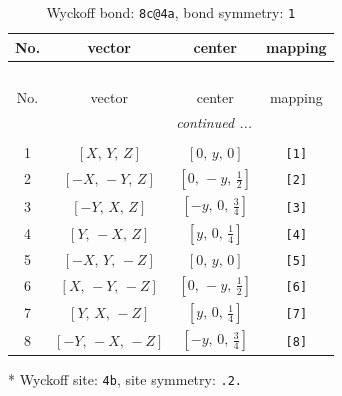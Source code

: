 \documentclass[fleqn,8pt]{jsarticle}
\begin{document}
\begin{longtable}{cccc}
\caption{Wyckoff bond: {\tt 8c@4a}, bond symmetry: {\tt 1}}
 \\
 \hline \hline
No. & vector & center & mapping \\ \hline \endfirsthead

\multicolumn{3}{l}{\tablename\ \thetable{}} \\
 \hline \hline
No. & vector & center & mapping \\ \hline \endhead

 \hline \hline
\multicolumn{3}{r}{\footnotesize\it continued ...} \\ \endfoot

 \hline \hline
\multicolumn{3}{r}{} \\ \endlastfoot

1 & $\left[ X,\, Y,\, Z \right]$ & $\left[ 0,\, y,\, 0 \right]$ & {\tt [1]} \\ \hline
2 & $\left[ - X,\, - Y,\, Z \right]$ & $\left[ 0,\, - y,\, \frac{1}{2} \right]$ & {\tt [2]} \\ \hline
3 & $\left[ - Y,\, X,\, Z \right]$ & $\left[ - y,\, 0,\, \frac{3}{4} \right]$ & {\tt [3]} \\ \hline
4 & $\left[ Y,\, - X,\, Z \right]$ & $\left[ y,\, 0,\, \frac{1}{4} \right]$ & {\tt [4]} \\ \hline
5 & $\left[ - X,\, Y,\, - Z \right]$ & $\left[ 0,\, y,\, 0 \right]$ & {\tt [5]} \\ \hline
6 & $\left[ X,\, - Y,\, - Z \right]$ & $\left[ 0,\, - y,\, \frac{1}{2} \right]$ & {\tt [6]} \\ \hline
7 & $\left[ Y,\, X,\, - Z \right]$ & $\left[ y,\, 0,\, \frac{1}{4} \right]$ & {\tt [7]} \\ \hline
8 & $\left[ - Y,\, - X,\, - Z \right]$ & $\left[ - y,\, 0,\, \frac{3}{4} \right]$ & {\tt [8]} \\
\end{longtable}
* Wyckoff site: {\tt 4b}, site symmetry: {\tt .2.}
\renewcommand{\arraystretch}{1.2}
\end{document}
